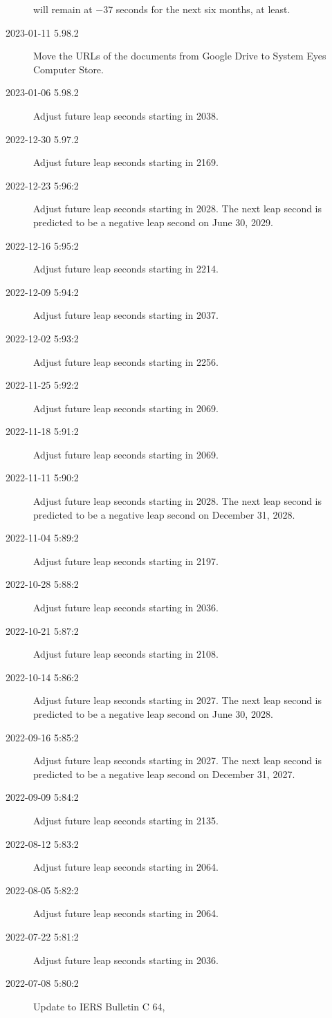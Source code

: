 \documentclass[letterpaper,twoside]{article}
\begin{document}
\begin{description}
  will remain at \num{-37} seconds for the next six months, at least.
\item[2023-01-11 5.98.2]Move the URLs of the documents from Google Drive
  to System Eyes Computer Store.
\item[2023-01-06 5.98.2]Adjust future leap seconds starting in 2038.
\item[2022-12-30 5.97.2]Adjust future leap seconds starting in 2169.
\item[2022-12-23 5:96:2]Adjust future leap seconds starting in 2028.
  The next leap second is predicted to be a negative leap second
  on June 30, 2029.
\item[2022-12-16 5:95:2]Adjust future leap seconds starting in 2214.
\item[2022-12-09 5:94:2]Adjust future leap seconds starting in 2037.
\item[2022-12-02 5:93:2]Adjust future leap seconds starting in 2256.
\item[2022-11-25 5:92:2]Adjust future leap seconds starting in 2069.
\item[2022-11-18 5:91:2]Adjust future leap seconds starting in 2069.
\item[2022-11-11 5:90:2]Adjust future leap seconds starting in 2028.
  The next leap second is predicted to be a negative leap second
  on December 31, 2028.
\item[2022-11-04 5:89:2]Adjust future leap seconds starting in 2197.
\item[2022-10-28 5:88:2]Adjust future leap seconds starting in 2036.
\item[2022-10-21 5:87:2]Adjust future leap seconds starting in 2108.
\item[2022-10-14 5:86:2]Adjust future leap seconds starting in 2027.
  The next leap second is predicted to be a negative leap second
  on June 30, 2028.
\item[2022-09-16 5:85:2]Adjust future leap seconds starting in 2027.
  The next leap second is predicted to be a negative leap second
  on December 31, 2027.
\item[2022-09-09 5:84:2]Adjust future leap seconds starting in 2135.
\item[2022-08-12 5:83:2]Adjust future leap seconds starting in 2064.
\item[2022-08-05 5:82:2]Adjust future leap seconds starting in 2064.
\item[2022-07-22 5:81:2]Adjust future leap seconds starting in 2036.
\item[2022-07-08 5:80:2]Update to IERS Bulletin C 64,

\end{description}
\end{document}
